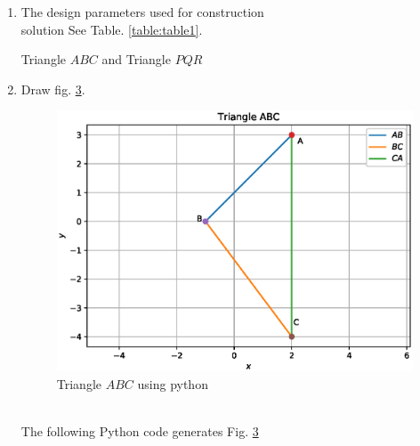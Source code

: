 \renewcommand{\theequation}{\theenumi}
\begin{enumerate}[label=\thesection.\arabic*.,ref=\thesection.\theenumi]

\begin{figure}[!ht]
\centering
\resizebox{\columnwidth}{!}{}
\caption{Triangle $ABC$ by Latex-tikz}
\label{fig:triangle_1}	
\end{figure}

\begin{figure}[!ht]
\centering
\resizebox{\columnwidth}{!}{}
\caption{Triangle $PQR$ by Latex-tikz}
\label{fig:triangle_2}	
\end{figure}


\item The design parameters used for construction \\
solution See Table. \ref{table:table1}.
\begin{table}[ht!]
\centering

\caption{Triangle $ABC$ and Triangle $PQR$}
\label{table:table1}	
\end{table} 


\item Draw fig. \ref{fig:triangle_1}.
\begin{figure}[!ht]
\centering
\includegraphics[width=\columnwidth]{./codes/triangle1.eps}
\caption{Triangle $ABC$ using python}
\label{fig:triangle_1}
\end{figure} \\
\solution The  following Python code generates Fig. \ref{fig:triangle_1}


\end{enumerate}
